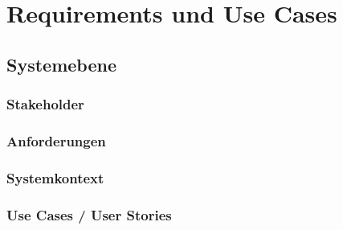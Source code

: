 \chapter{Requirements und Use Cases}\label{ch:requirements-und-use-cases}


\section{Systemebene}\label{sec:systemebene}


\subsection{Stakeholder}\label{subsec:stakeholder}


\subsection{Anforderungen}\label{subsec:anforderungen2}


\subsection{Systemkontext}\label{subsec:systemkontext2}


\subsection{Use Cases / User Stories}\label{subsec:use-cases-user-stories}


